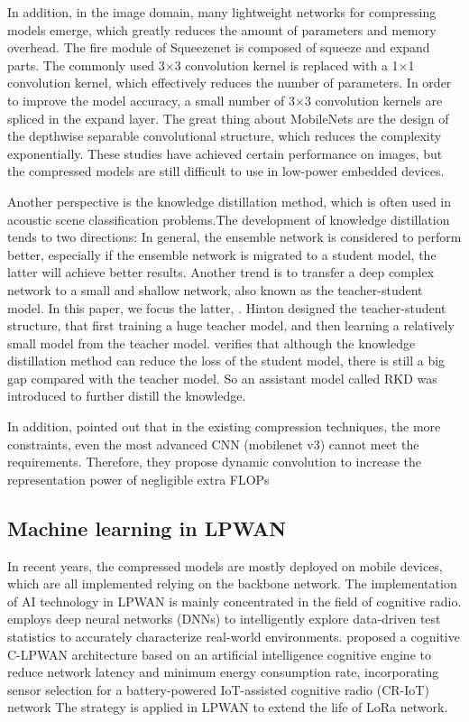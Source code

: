 \documentclass[conference]{IEEEtran}
\begin{document}
	In addition, in the image domain, many lightweight networks for compressing
	models emerge, which greatly reduces the amount of parameters and memory
	overhead. The fire module of Squeezenet\cite{iandola2016squeezenet} is composed
	of squeeze and expand parts. The commonly used 3×3 convolution kernel is
	replaced with a 1×1 convolution kernel, which effectively reduces the number of
	parameters. In order to improve the model accuracy, a small number of 3×3
	convolution kernels are spliced in the expand layer. The great thing about
	MobileNets\cite{howard2017mobilenets}\cite{sandler2019mobilenetv2}\cite{howard2019searching}
	are the design of the depthwise separable convolutional structure, which reduces
	the complexity exponentially. These studies have achieved certain performance on
	images, but the compressed models are still difficult to use in low-power
	embedded devices.
	
	Another perspective is the knowledge distillation method, which is often used in
	acoustic scene classification problems\cite{9186616}.The development of
	knowledge distillation tends to two directions: In general, the ensemble network
	is considered to perform better, especially if the ensemble network is migrated
	to a student model, the latter will achieve better
	results\cite{DBLP:journals/corr/abs-2012-09816}. Another trend is to transfer a
	deep complex network to a small and shallow network, also known as the
	teacher-student model. In this paper, we focus the latter,    .
	Hinton\cite{hinton2015distilling} designed the teacher-student structure, that
	first training a huge teacher model, and then learning a relatively small model
	from the teacher model. \cite{GAO2021154} verifies that although the knowledge
	distillation method can reduce the loss of the student model, there is still a
	big gap compared with the teacher model. So an assistant model called RKD was
	introduced to further distill the knowledge. 
	
	In addition, \cite{9157588} pointed out that in the existing compression techniques, the more constraints, even the most advanced CNN (mobilenet v3) cannot meet the requirements. Therefore, they propose dynamic convolution to increase the representation power of negligible extra FLOPs
	\subsection{Machine learning in LPWAN}
	In recent years, the compressed models are mostly deployed on mobile devices,
	which are all implemented relying on the backbone network. The implementation of
	AI technology in LPWAN is mainly concentrated in the field of cognitive
	radio\cite{8972333}. \cite{8792213}employs deep neural networks (DNNs) to
	intelligently explore data-driven test statistics to accurately characterize
	real-world environments. \cite{8480446} proposed a cognitive C-LPWAN
	architecture based on an artificial intelligence cognitive engine to reduce
	network latency and minimum energy consumption rate, incorporating sensor
	selection for a battery-powered IoT-assisted cognitive radio (CR-IoT) network
	The strategy is applied in LPWAN to extend the life of LoRa network.
	
\end{document}
